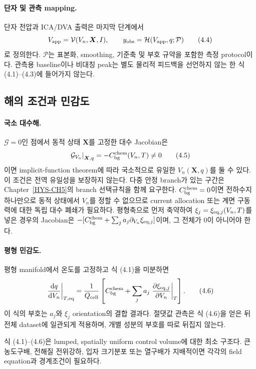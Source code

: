 \paragraph{ 단자 및 관측 mapping.}
단자 전압과 ICA/DVA 출력은 마지막 단계에서
\[
 V_{\mathrm{app}}=\mathcal V(V_n,\bm X,I),\qquad
 y_{\mathrm{obs}}=\mathcal H(V_{\mathrm{app}},q;\mathcal P)
 \tag{4.4}
\]
로 정의한다. $\mathcal P$는 표본화, smoothing, 기준축 및 부호
규약을 포함한 측정 protocol이다. 관측용 baseline이나 비대칭
peak는 별도 물리적 피드백을 선언하지 않는 한 식 (4.1)--(4.3)에
들어가지 않는다.

\subsection{해의 조건과 민감도}

\paragraph{ 국소 대수해.}
$\mathcal G=0$인 점에서 동적 상태 $\bm X$를 고정한 대수
Jacobian은
\[
 \left.\mathcal G_{V_n}\right|_{\bm X,q}
 =-C_{\mathrm{bg}}^{\mathrm{chem}}(V_n,T)\ne0
 \tag{4.5}
\]
이면 implicit-function theorem에 따라 국소적으로 유일한
$V_n(\bm X,q)$를 둘 수 있다. 이 조건은 전역 유일성을 보장하지
않는다. 다중 안정 branch가 있는 구간은 Chapter~\ref{HYS-CH5}의
branch 선택규칙을 함께 요구한다. $C_{\mathrm{bg}}^{\mathrm{chem}}=0$이면 전하수지
하나만으로 동적 상태에서 $V_n$를 정할 수 없으므로 current
allocation 또는 계면 구동력에 대한 독립 대수 폐쇄가 필요하다.
평형축으로 먼저 축약하여 $\xi_j=\xi_{\mathrm{eq},j}(V_n,T)$를 넣은
경우의 Jacobian은
$-[C_{\mathrm{bg}}^{\mathrm{chem}}+\sum_j a_j\partial_{V_n}\xi_{\mathrm{eq},j}]$이며,
그 전체가 0이 아니어야 한다.

\paragraph{ 평형 민감도.}
평형 manifold에서 온도를 고정하고 식 (4.1)을 미분하면
\[
 \left.\frac{\mathrm d q}{\mathrm d V_n}\right|_{T,\mathrm{eq}}
 =\frac{1}{Q_{\mathrm{cell}}}\left[
 C_{\mathrm{bg}}^{\mathrm{chem}}+\sum_j a_j
 \left.\frac{\partial\xi_{\mathrm{eq},j}}{\partial V_n}\right|_T
 \right].
 \tag{4.6}
\]
이 식의 부호는 $a_j$와 $\xi_j$ orientation의 결합 결과다.
절댓값 관측은 식 (4.6)을 얻은 뒤 전체 dataset에 일관되게
적용하며, 개별 성분의 부호를 따로 뒤집지 않는다.

\begin{validity}
식 (4.1)--(4.6)은 lumped, spatially uniform control volume에
대한 최소 구조다. 큰 농도구배, 전해질 전위강하, 입자 크기분포 또는
열구배가 지배적이면 각각의 field equation과 경계조건이 필요하다.
\end{validity}

